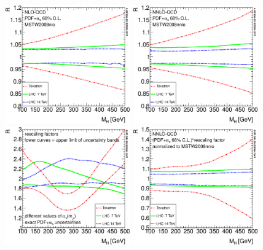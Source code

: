 \begin{figure}
  \begin{center}
    \includegraphics[width=0.48\textwidth]{YRHXS_PDF/YRHXS_PDF_8}
    \includegraphics[width=0.48\textwidth]{YRHXS_PDF/YRHXS_PDF_9}\\%
    \includegraphics[width=0.48\textwidth]{YRHXS_PDF/YRHXS_PDF_10}
    \includegraphics[width=0.48\textwidth]{YRHXS_PDF/YRHXS_PDF_11}    

\end{center}
\end{figure}
